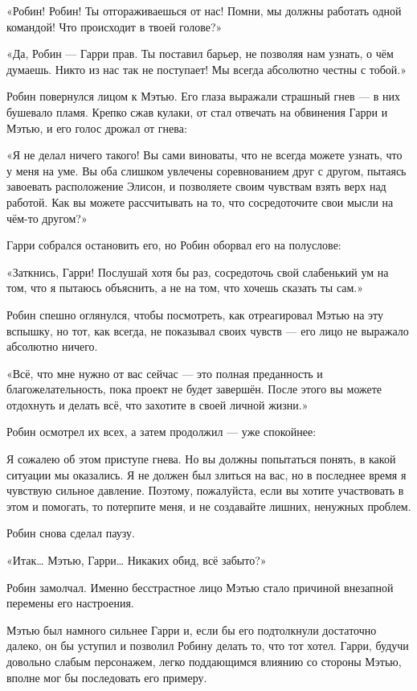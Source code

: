 \documentclass[a5paper, 9pt,
final, openany, twoside=true]{memoir}
\begin{document}
«Робин! Робин! Ты отгораживаешься от нас! Помни, мы должны работать одной командой! Что происходит в твоей голове?»

«Да, Робин — Гарри прав. Ты поставил барьер, не позволяя нам узнать, о чём думаешь. Никто из нас так не поступает! Мы всегда абсолютно честны с тобой.»

Робин повернулся лицом к Мэтью. Его глаза выражали страшный гнев — в них бушевало пламя. Крепко сжав кулаки, от стал отвечать на обвинения Гарри и Мэтью, и его голос дрожал от гнева:

«Я не делал ничего такого! Вы сами виноваты, что не всегда можете узнать, что у меня на уме. Вы оба слишком увлечены соревнованием друг с другом, пытаясь завоевать расположение Элисон, и позволяете своим чувствам взять верх над работой. Как вы можете рассчитывать на то, что сосредоточите свои мысли на чём-то другом?»

Гарри собрался остановить его, но Робин оборвал его на полуслове:

«Заткнись, Гарри! Послушай хотя бы раз, сосредоточь свой слабенький ум на том, что я пытаюсь объяснить, а не на том, что хочешь сказать ты сам.»

Робин спешно оглянулся, чтобы посмотреть, как отреагировал Мэтью на эту вспышку, но тот, как всегда, не показывал своих чувств — его лицо не выражало абсолютно ничего.

«Всё, что мне нужно от вас сейчас — это полная преданность и благожелательность, пока проект не будет завершён. После этого вы можете отдохнуть и делать всё, что захотите в своей личной жизни.»

Робин осмотрел их всех, а затем продолжил — уже спокойнее:

Я сожалею об этом приступе гнева. Но вы должны попытаться понять, в какой ситуации мы оказались. Я не должен был злиться на вас, но в последнее время я чувствую сильное давление. Поэтому, пожалуйста, если вы хотите участвовать в этом и помогать, то потерпите меня, и не создавайте лишних, ненужных проблем.

Робин снова сделал паузу.

«Итак… Мэтью, Гарри… Никаких обид, всё забыто?»\bigskip

Робин замолчал. Именно бесстрастное лицо Мэтью стало причиной внезапной перемены его настроения.

Мэтью был намного сильнее Гарри и, если бы его подтолкнули достаточно далеко, он бы уступил и позволил Робину делать то, что тот хотел. Гарри, будучи довольно слабым персонажем, легко поддающимся влиянию со стороны Мэтью, вполне мог бы последовать его примеру.
\end{document}
